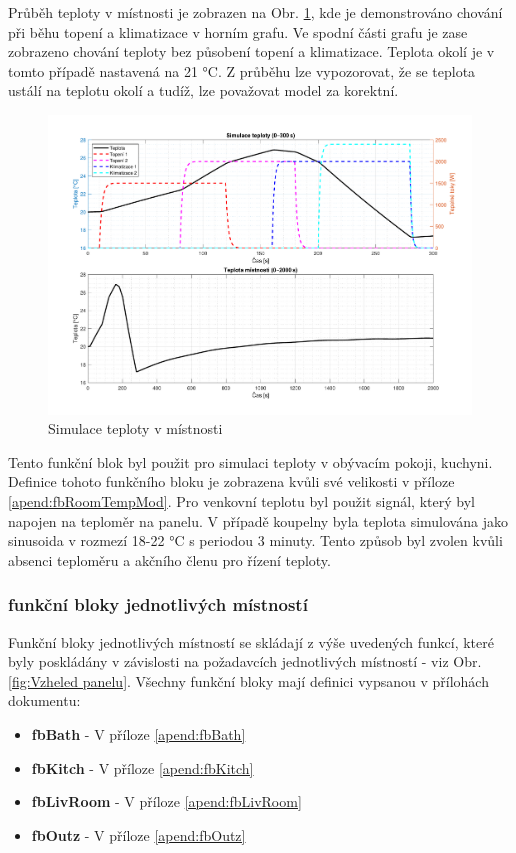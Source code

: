 \noindent Průběh teploty v místnosti je zobrazen na Obr. \ref{fig:simulace_teplota}, kde je demonstrováno chování při běhu topení a klimatizace v horním grafu. Ve spodní části grafu je zase zobrazeno chování teploty bez působení topení a klimatizace. Teplota okolí je v tomto případě nastavená na 21 °C. Z průběhu lze vypozorovat, že se teplota ustálí na teplotu okolí a tudíž, lze považovat model za korektní.
\newpage
\begin{figure}[!ht]
    \begin{center}
        \includegraphics[scale=0.52]{obrazky/simulace_teploty_kuchyne.pdf}
    \end{center}
    \caption[Simulace teploty v místnosti]{Simulace teploty v místnosti}
    \label{fig:simulace_teplota}
\end{figure}

\noindent Tento funkční blok byl použit pro simulaci teploty v obývacím pokoji, kuchyni. Definice tohoto funkčního bloku je zobrazena kvůli své velikosti v příloze \ref{apend:fbRoomTempMod}. Pro venkovní teplotu byl použit signál, který byl napojen na teploměr na panelu. V případě koupelny byla teplota simulována jako sinusoida v rozmezí 18-22 °C s periodou 3 minuty. Tento způsob byl zvolen kvůli absenci teploměru a akčního členu pro řízení teploty. 

\subsubsection{funkční bloky jednotlivých místností}
\label{subsection:fb_mistnosti}
Funkční bloky jednotlivých místností se skládají z výše uvedených funkcí, které byly poskládány v závislosti na požadavcích jednotlivých místností - viz Obr. \ref{fig:Vzheled panelu}. Všechny funkční bloky mají definici vypsanou v přílohách dokumentu:
\begin{itemize}
    \item \textbf{fbBath} - V příloze \ref{apend:fbBath}
    \item \textbf{fbKitch} - V příloze \ref{apend:fbKitch}
    \item \textbf{fbLivRoom} - V příloze \ref{apend:fbLivRoom}
    \item \textbf{fbOutz} - V příloze \ref{apend:fbOutz}
\end{itemize}

